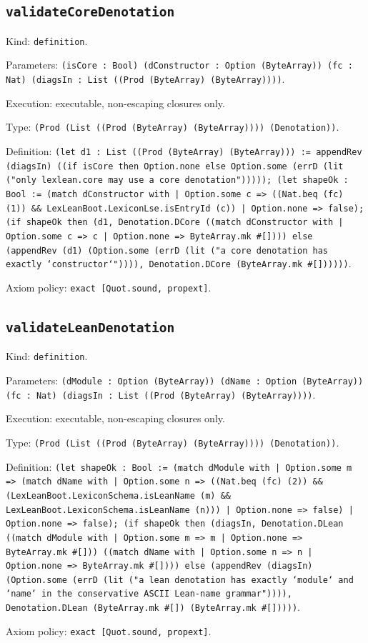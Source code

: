 \documentclass[11pt]{article}
\begin{document}
\subsection*{\texttt{validateCoreDenotation}}
\noindent Kind: \texttt{definition}.\par
\noindent Parameters: \texttt{(isCore : Bool) (dConstructor : Option (ByteArray)) (fc : Nat) (diagsIn : List ((Prod (ByteArray) (ByteArray))))}.\par
\noindent Execution: executable, non-escaping closures only.\par
\noindent Type: \texttt{(Prod (List ((Prod (ByteArray) (ByteArray)))) (Denotation))}.\par
\noindent Definition: \texttt{(let d1 : List ((Prod (ByteArray) (ByteArray))) := appendRev (diagsIn) ((if isCore then Option.none else Option.some (errD (lit ("only lexlean.core may use a core denotation"))))); (let shapeOk : Bool := (match dConstructor with | Option.some c => ((Nat.beq (fc) (1)) \&\& LexLeanBoot.LexiconLse.isEntryId (c)) | Option.none => false); (if shapeOk then (d1, Denotation.DCore ((match dConstructor with | Option.some c => c | Option.none => ByteArray.mk \#[]))) else (appendRev (d1) (Option.some (errD (lit ("a core denotation has exactly `constructor`")))), Denotation.DCore (ByteArray.mk \#[])))))}.\par
\noindent Axiom policy: \texttt{exact [Quot.sound, propext]}.\par
\subsection*{\texttt{validateLeanDenotation}}
\noindent Kind: \texttt{definition}.\par
\noindent Parameters: \texttt{(dModule : Option (ByteArray)) (dName : Option (ByteArray)) (fc : Nat) (diagsIn : List ((Prod (ByteArray) (ByteArray))))}.\par
\noindent Execution: executable, non-escaping closures only.\par
\noindent Type: \texttt{(Prod (List ((Prod (ByteArray) (ByteArray)))) (Denotation))}.\par
\noindent Definition: \texttt{(let shapeOk : Bool := (match dModule with | Option.some m => (match dName with | Option.some n => ((Nat.beq (fc) (2)) \&\& (LexLeanBoot.LexiconSchema.isLeanName (m) \&\& LexLeanBoot.LexiconSchema.isLeanName (n))) | Option.none => false) | Option.none => false); (if shapeOk then (diagsIn, Denotation.DLean ((match dModule with | Option.some m => m | Option.none => ByteArray.mk \#[])) ((match dName with | Option.some n => n | Option.none => ByteArray.mk \#[]))) else (appendRev (diagsIn) (Option.some (errD (lit ("a lean denotation has exactly `module` and `name` in the conservative ASCII Lean-name grammar")))), Denotation.DLean (ByteArray.mk \#[]) (ByteArray.mk \#[]))))}.\par
\noindent Axiom policy: \texttt{exact [Quot.sound, propext]}.\par
\end{document}
